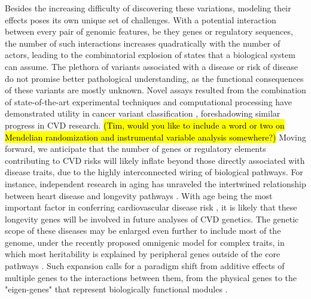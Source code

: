 \documentclass[letter]{bioinfo}
\begin{document}
Besides the increasing difficulty of discovering these variations, modeling their effects poses its own unique set of challenges. With a potential interaction between every pair of genomic features, be they genes or regulatory sequences, the number of such interactions increases quadratically with the number of actors, leading to the combinatorial explosion of states that a biological system can assume.  The plethora of variants associated with a disease or risk of disease do not promise better pathological understanding, as the functional consequences of these variants are mostly unknown. Novel assays resulted from the combination of state-of-the-art experimental techniques and computational processing have demonstrated utility in cancer variant classification \citep{Findlay:2018:Accurate}, foreshadowing similar progress in CVD research.
	\hl{(Tim, would you like to include a word or two on Mendelian randomization and instrumental variable analysis somewhere?)}  
Moving forward, we anticipate that the number of genes or regulatory elements contributing to CVD risks will likely inflate beyond those directly associated with disease traits, due to the highly interconnected wiring of biological pathways.  For instance, independent research in aging has unraveled the intertwined relationship between heart disease and longevity pathways \citep{North:2012:Intersection}.  With age being the most important factor in conferring cardiovascular disease risk \citep{Steenman:2017:Cardiac}, it is likely that these longevity genes will be involved in future analyses of CVD genetics. The genetic scope of these diseases may be enlarged even further to include most of the genome, under the recently proposed omnigenic model for complex traits, in which most heritability is explained by peripheral genes outside of the core pathways \citep{Boyle:2017:Expanded}. Such expansion calls for a paradigm shift from additive effects of multiple genes to the interactions between them, from the physical genes to the "eigen-genes" that represent biologically functional modules \citep{Weiss:2012:Good}.
	
\end{document}
